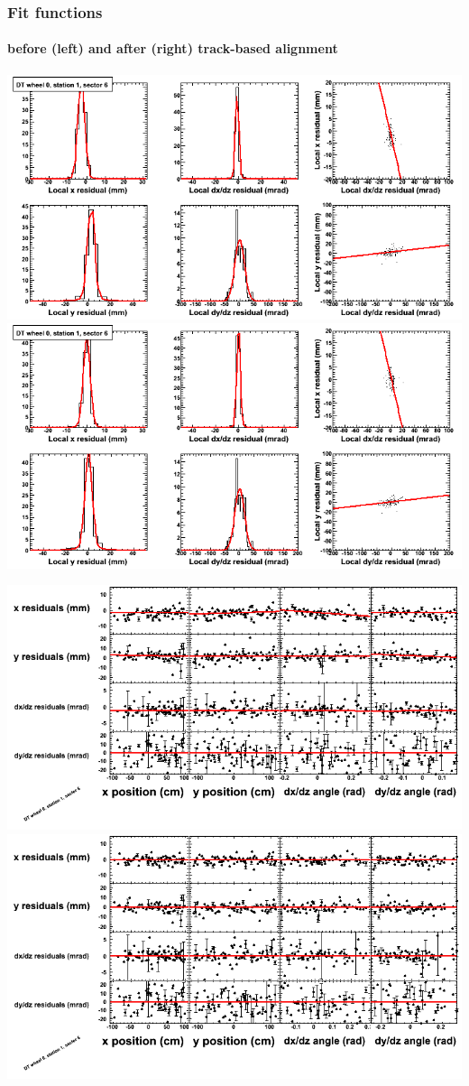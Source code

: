 \documentclass[compress]{beamer}
\begin{document}
\begin{frame}
\frametitle{Fit functions}
\framesubtitle{before (left) and after (right) track-based alignment}
\includegraphics[width=0.5\linewidth]{fitfunctions_re01/MBwhCst1sec06_bellcurves.png} \includegraphics[width=0.5\linewidth]{fitfunctions_re05/MBwhCst1sec06_bellcurves.png}

\includegraphics[width=0.5\linewidth]{fitfunctions_re01/MBwhCst1sec06_polynomials.png} \includegraphics[width=0.5\linewidth]{fitfunctions_re05/MBwhCst1sec06_polynomials.png}
\end{frame}
\end{document}
